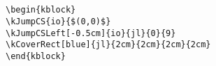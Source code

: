 \documentclass[onecolumn,a4paper,10pt]{IEEEtran}
\newcommand*{\spacetweak}{\medskip\medskip}
\begin{document}
\spacetweak

\subsection{}\spacetweak
\begin{kblock}
\end{kblock}

\begin{lstlisting}
\begin{kblock}
\kJumpCS{io}{$(0,0)$}
\kJumpCSLeft[-0.5cm]{io}{jl}{0}{9}
\kCoverRect[blue]{jl}{2cm}{2cm}{2cm}{2cm}
\end{kblock}
\end{lstlisting}

\spacetweak
\end{document}
